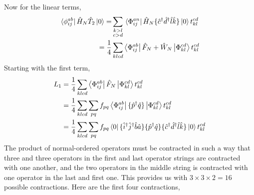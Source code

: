 Now for the linear terms,
\begin{equation}
    \begin{aligned}
        \bra*{\phi^{ab}_{ij}} \hat{H}_N \hat{T}_2 \ket{0} 
            = &\sum_{\substack{k>l \\ c>d}} \bra*{\Phi^{an}_{ij}} \hat{H}_N
                \{\hat{c}^\dagger \hat{d}^\dagger \hat{l} \hat{k} \} \ket{0}t^{cd}_{kl} \\
            = \frac{1}{4} &\sum_{klcd} \bra{\Phi^{ab}_{ij}} \hat{F}_N + \hat{W}_N\ket{\Phi^{cd}_{kl}}t^{cd}_{kl}
    \end{aligned}
\end{equation}
Starting with the first term,
\begin{equation}
    \begin{aligned}
         L_1 &= \frac{1}{4}\sum_{klcd} \bra{\Phi^{ab}_{ij}} \hat{F}_N \ket{\Phi^{cd}_{kl}} t^{cd}_{kl} \\
            &= \frac{1}{4}\sum_{klcd} \sum_{pq} f_{pq} \bra{\Phi^{ab}_{ij}}
                \{ \hat{p}^\dagger \hat{q}\} \ket{\Phi^{cd}_{kl}} t^{cd}_{kl} \\
            &= \frac{1}{4} \sum_{klcd}\sum_{pq} f_{pq} \bra{0}
                \{\hat{i}^\dagger \hat{j}^\dagger \hat{b} \hat{a} \}
                \{\hat{p}^\dagger \hat{q}\} 
                \{\hat{c}^\dagger \hat{d}^\dagger \hat{l} \hat{k} \}
            \ket{0} t^{cd}_{kl}
    \end{aligned}
\end{equation}
The product of normal-ordered operators must be contracted in such a way that three and
three operators in the first and last operator strings are contracted with one another,
and the two operators in the middle string is contracted with one operator in the last
and first one. This provides us with $3\times 3 \times 2 = 16$ possible contractions.
Here are the first four contractions,

